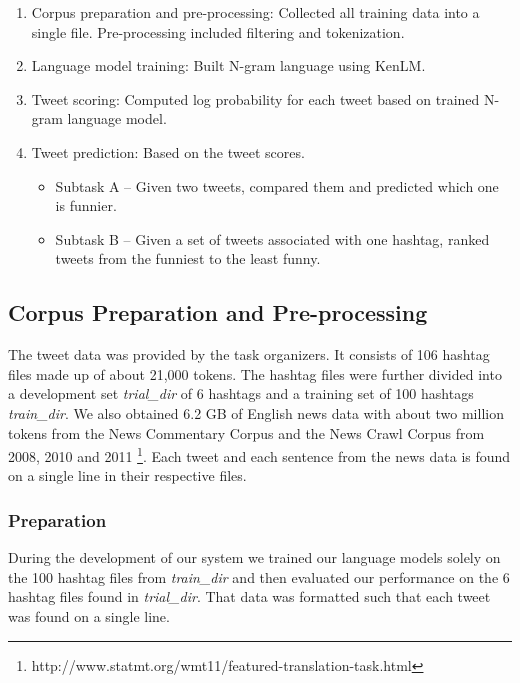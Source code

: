 \documentclass[11pt,a4paper]{article}
\begin{document}
\begin{enumerate}
\item Corpus preparation and pre-processing: Collected all training data into a single file.
Pre-processing included filtering and tokenization.
\item Language model training: Built N-gram language using KenLM.
\item Tweet scoring: Computed log probability for each tweet based on trained N-gram 
language model. 
\item Tweet prediction: Based on the tweet scores.   

\begin{itemize}
\item Subtask A -- Given two tweets, compared them and predicted which one is funnier. 
\item Subtask B -- Given a set of tweets associated with one hashtag, ranked 
tweets from the funniest to the least funny.

\end{itemize}
\end{enumerate}

\subsection{Corpus Preparation and Pre-processing}

The tweet data was provided by the task organizers. It consists of 106 hashtag files made up of about 21,000 tokens. The hashtag files
were further divided into a development set \textit{trial\_dir} of 6 hashtags and a training set of 100 hashtags \textit{train\_dir}. 
We also obtained 6.2 GB of English news data with about two million tokens from the News 
Commentary Corpus and the News Crawl Corpus from 2008, 2010 and 2011 \footnote{http://www.statmt.org/wmt11/featured-translation-task.html}.   
Each tweet and each sentence from the news data is found on a single line in their respective files.

\subsubsection{Preparation}

During the development of our system we trained our language models solely on the 100 hashtag files from \textit{train\_dir}
and then evaluated our performance on the 6 hashtag files found in \textit{trial\_dir}. That data was formatted such that each
tweet was found on a single line.  
\end{document}
